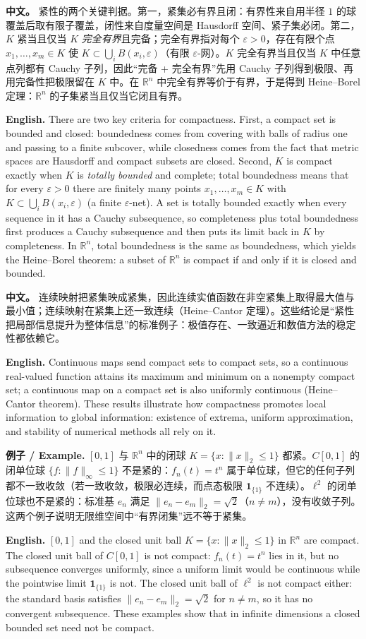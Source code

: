 \documentclass[UTF8,11pt,a4paper]{ctexart}
\newcommand{\EN}[1]{\par\noindent \textbf{English.} #1\par}
\newcommand{\EX}[2]{\par\noindent \textbf{例子 / Example.} #1\par\EN{#2}}
\newcommand{\APS}[2]{\par\noindent\textbf{中文。} #1\par\noindent\textbf{English.} #2\par\smallskip}
\begin{document}
\APS{紧性的两个关键判据。第一，紧集必有界且闭：有界性来自用半径 $1$ 的球覆盖后取有限子覆盖，闭性来自度量空间是 Hausdorff 空间、紧子集必闭。第二，$K$ 紧当且仅当 $K$ \emph{完全有界}且完备；完全有界指对每个 $\varepsilon>0$，存在有限个点 $x_1,\ldots,x_m\in K$ 使 $K\subset\bigcup_iB(x_i,\varepsilon)$（有限 $\varepsilon$-网）。$K$ 完全有界当且仅当 $K$ 中任意点列都有 Cauchy 子列，因此“完备 + 完全有界”先用 Cauchy 子列得到极限、再用完备性把极限留在 $K$ 中。在 $\mathbb R^n$ 中完全有界等价于有界，于是得到 Heine--Borel 定理：$\mathbb R^n$ 的子集紧当且仅当它闭且有界。}{There are two key criteria for compactness. First, a compact set is bounded and closed: boundedness comes from covering with balls of radius one and passing to a finite subcover, while closedness comes from the fact that metric spaces are Hausdorff and compact subsets are closed. Second, $K$ is compact exactly when $K$ is \emph{totally bounded} and complete; total boundedness means that for every $\varepsilon>0$ there are finitely many points $x_1,\ldots,x_m\in K$ with $K\subset\bigcup_iB(x_i,\varepsilon)$ (a finite $\varepsilon$-net). A set is totally bounded exactly when every sequence in it has a Cauchy subsequence, so completeness plus total boundedness first produces a Cauchy subsequence and then puts its limit back in $K$ by completeness. In $\mathbb R^n$, total boundedness is the same as boundedness, which yields the Heine--Borel theorem: a subset of $\mathbb R^n$ is compact if and only if it is closed and bounded.}

\APS{连续映射把紧集映成紧集，因此连续实值函数在非空紧集上取得最大值与最小值；连续映射在紧集上还一致连续（Heine--Cantor 定理）。这些结论是“紧性把局部信息提升为整体信息”的标准例子：极值存在、一致逼近和数值方法的稳定性都依赖它。}{Continuous maps send compact sets to compact sets, so a continuous real-valued function attains its maximum and minimum on a nonempty compact set; a continuous map on a compact set is also uniformly continuous (Heine--Cantor theorem). These results illustrate how compactness promotes local information to global information: existence of extrema, uniform approximation, and stability of numerical methods all rely on it.}

\EX{$[0,1]$ 与 $\mathbb R^n$ 中的闭球 $K=\{x:\|x\|_2\le1\}$ 都紧。$C[0,1]$ 的闭单位球 $\{f:\|f\|_\infty\le1\}$ 不是紧的：$f_n(t)=t^n$ 属于单位球，但它的任何子列都不一致收敛（若一致收敛，极限必连续，而点态极限 $\mathbf 1_{\{1\}}$ 不连续）。$\ell^2$ 的闭单位球也不是紧的：标准基 $e_n$ 满足 $\|e_n-e_m\|_2=\sqrt2$（$n\ne m$），没有收敛子列。这两个例子说明无限维空间中“有界闭集”远不等于紧集。}{$[0,1]$ and the closed unit ball $K=\{x:\|x\|_2\le1\}$ in $\mathbb R^n$ are compact. The closed unit ball of $C[0,1]$ is not compact: $f_n(t)=t^n$ lies in it, but no subsequence converges uniformly, since a uniform limit would be continuous while the pointwise limit $\mathbf 1_{\{1\}}$ is not. The closed unit ball of $\ell^2$ is not compact either: the standard basis satisfies $\|e_n-e_m\|_2=\sqrt2$ for $n\ne m$, so it has no convergent subsequence. These examples show that in infinite dimensions a closed bounded set need not be compact.}
\end{document}
